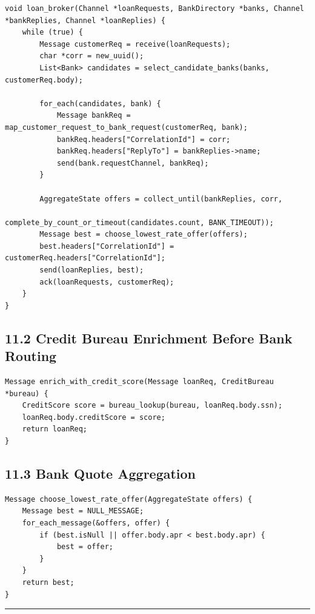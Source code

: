 \documentclass[11pt]{article}
\begin{document}
\begin{verbatim}
void loan_broker(Channel *loanRequests, BankDirectory *banks, Channel *bankReplies, Channel *loanReplies) {
    while (true) {
        Message customerReq = receive(loanRequests);
        char *corr = new_uuid();
        List<Bank> candidates = select_candidate_banks(banks, customerReq.body);

        for_each(candidates, bank) {
            Message bankReq = map_customer_request_to_bank_request(customerReq, bank);
            bankReq.headers["CorrelationId"] = corr;
            bankReq.headers["ReplyTo"] = bankReplies->name;
            send(bank.requestChannel, bankReq);
        }

        AggregateState offers = collect_until(bankReplies, corr,
                                             complete_by_count_or_timeout(candidates.count, BANK_TIMEOUT));
        Message best = choose_lowest_rate_offer(offers);
        best.headers["CorrelationId"] = customerReq.headers["CorrelationId"];
        send(loanReplies, best);
        ack(loanRequests, customerReq);
    }
}
\end{verbatim}

\subsection{11.2 Credit Bureau Enrichment Before Bank
Routing}\label{credit-bureau-enrichment-before-bank-routing}

\begin{verbatim}
Message enrich_with_credit_score(Message loanReq, CreditBureau *bureau) {
    CreditScore score = bureau_lookup(bureau, loanReq.body.ssn);
    loanReq.body.creditScore = score;
    return loanReq;
}
\end{verbatim}

\subsection{11.3 Bank Quote Aggregation}\label{bank-quote-aggregation}

\begin{verbatim}
Message choose_lowest_rate_offer(AggregateState offers) {
    Message best = NULL_MESSAGE;
    for_each_message(&offers, offer) {
        if (best.isNull || offer.body.apr < best.body.apr) {
            best = offer;
        }
    }
    return best;
}
\end{verbatim}

\begin{center}\rule{0.5\linewidth}{0.5pt}\end{center}
\end{document}
